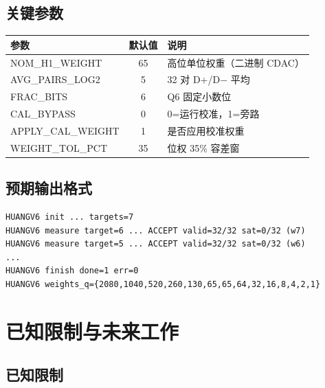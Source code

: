 \documentclass[UTF8,a4paper,12pt]{ctexart}
\theoremstyle{definition}
\begin{document}
\subsection{关键参数}

\begin{longtable}{lcl}
\toprule
\textbf{参数} & \textbf{默认值} & \textbf{说明} \\
\midrule
\endhead
\bottomrule
\endfoot
NOM\_H1\_WEIGHT & 65 & 高位单位权重（二进制 CDAC） \\
AVG\_PAIRS\_LOG2 & 5 & 32 对 D+/D$-$ 平均 \\
FRAC\_BITS & 6 & Q6 固定小数位 \\
CAL\_BYPASS & 0 & 0=运行校准，1=旁路 \\
APPLY\_CAL\_WEIGHT & 1 & 是否应用校准权重 \\
WEIGHT\_TOL\_PCT & 35 & 位权 35\% 容差窗 \\
\bottomrule
\end{longtable}

\subsection{预期输出格式}

\begin{lstlisting}
HUANGV6 init ... targets=7
HUANGV6 measure target=6 ... ACCEPT valid=32/32 sat=0/32 (w7)
HUANGV6 measure target=5 ... ACCEPT valid=32/32 sat=0/32 (w6)
...
HUANGV6 finish done=1 err=0
HUANGV6 weights_q={2080,1040,520,260,130,65,65,64,32,16,8,4,2,1}
\end{lstlisting}

\section{已知限制与未来工作}

\subsection{已知限制}
\end{document}
